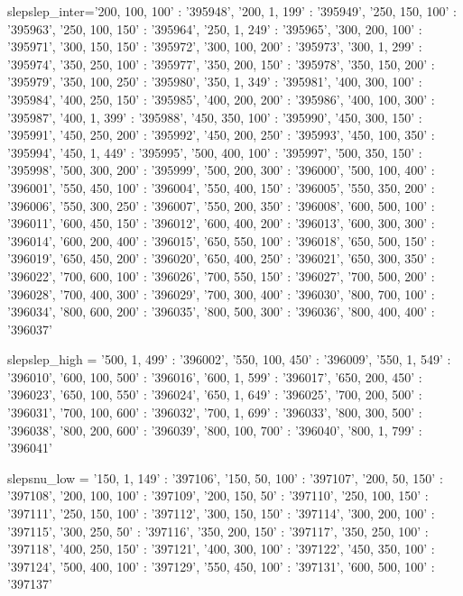     


slepslep_inter={'200, 100, 100' : '395948',
    '200, 1, 199' : '395949',
    '250, 150, 100' : '395963',
    '250, 100, 150' : '395964',
    '250, 1, 249' : '395965',
    '300, 200, 100' : '395971',
    '300, 150, 150' : '395972',
    '300, 100, 200' : '395973',
    '300, 1, 299' : '395974',
    '350, 250, 100' : '395977',
    '350, 200, 150' : '395978',
    '350, 150, 200' : '395979',
    '350, 100, 250' : '395980',
    '350, 1, 349' : '395981',
    '400, 300, 100' : '395984',
    '400, 250, 150' : '395985',
    '400, 200, 200' : '395986',
    '400, 100, 300' : '395987',
    '400, 1, 399' : '395988',
    '450, 350, 100' : '395990',
    '450, 300, 150' : '395991',
    '450, 250, 200' : '395992',
    '450, 200, 250' : '395993',
    '450, 100, 350' : '395994',
    '450, 1, 449' : '395995',
    '500, 400, 100' : '395997',
    '500, 350, 150' : '395998',
    '500, 300, 200' : '395999',
    '500, 200, 300' : '396000',
    '500, 100, 400' : '396001',
    '550, 450, 100' : '396004',
    '550, 400, 150' : '396005',
    '550, 350, 200' : '396006',
    '550, 300, 250' : '396007',
    '550, 200, 350' : '396008',
    '600, 500, 100' : '396011',
    '600, 450, 150' : '396012',
    '600, 400, 200' : '396013',
    '600, 300, 300' : '396014',
    '600, 200, 400' : '396015',
    '650, 550, 100' : '396018',
    '650, 500, 150' : '396019',
    '650, 450, 200' : '396020',
    '650, 400, 250' : '396021',
    '650, 300, 350' : '396022',
    '700, 600, 100' : '396026',
    '700, 550, 150' : '396027',
    '700, 500, 200' : '396028',
    '700, 400, 300' : '396029',
    '700, 300, 400' : '396030',
    '800, 700, 100' : '396034',
    '800, 600, 200' : '396035',
    '800, 500, 300' : '396036',
    '800, 400, 400' : '396037'}

slepslep_high = {'500, 1, 499' : '396002',
    '550, 100, 450' : '396009',
    '550, 1, 549' : '396010',
    '600, 100, 500' : '396016',
    '600, 1, 599' : '396017',
    '650, 200, 450' : '396023',
    '650, 100, 550' : '396024',
    '650, 1, 649' : '396025',
    '700, 200, 500' : '396031',
    '700, 100, 600' : '396032',
    '700, 1, 699' : '396033',
    '800, 300, 500' : '396038',
    '800, 200, 600' : '396039',
    '800, 100, 700' : '396040',
    '800, 1, 799' : '396041'}


slepsnu_low = {'150, 1, 149' : '397106',
    '150, 50, 100' : '397107',
    '200, 50, 150' : '397108',
    '200, 100, 100' : '397109',
    '200, 150, 50' : '397110',
    '250, 100, 150' : '397111',
    '250, 150, 100' : '397112',
    '300, 150, 150' : '397114',
    '300, 200, 100' : '397115',
    '300, 250, 50' : '397116',
    '350, 200, 150' : '397117',
    '350, 250, 100' : '397118',
    '400, 250, 150' : '397121',
    '400, 300, 100' : '397122',
    '450, 350, 100' : '397124',
    '500, 400, 100' : '397129',
    '550, 450, 100' : '397131',
    '600, 500, 100' : '397137'}




